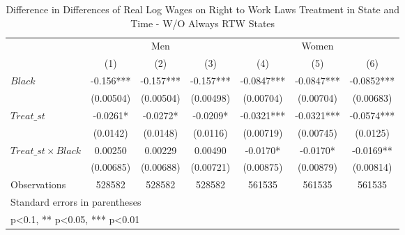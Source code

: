 \begin{table}[htbp]\centering
\def\sym#1{\ifmmode^{#1}\else\(^{#1}\)\fi}
\caption{Difference in Differences of Real Log Wages on Right to Work Laws Treatment in State and Time - W/O Always RTW States}
\begin{tabular}{l*{6}{c}}
\hline\hline
                    &\multicolumn{3}{c}{Men}                        &\multicolumn{3}{c}{Women}                      \\\cmidrule(lr){2-4}\cmidrule(lr){5-7}
                    &\multicolumn{1}{c}{(1)}   &\multicolumn{1}{c}{(2)}   &\multicolumn{1}{c}{(3)}   &\multicolumn{1}{c}{(4)}   &\multicolumn{1}{c}{(5)}   &\multicolumn{1}{c}{(6)}   \\
\hline
$ Black $           &      -0.156***&      -0.157***&      -0.157***&     -0.0847***&     -0.0847***&     -0.0852***\\
                    &   (0.00504)   &   (0.00504)   &   (0.00498)   &   (0.00704)   &   (0.00704)   &   (0.00683)   \\
[1em]
$ Treat\_{st} $      &     -0.0261*  &     -0.0272*  &     -0.0209*  &     -0.0321***&     -0.0321***&     -0.0574***\\
                    &    (0.0142)   &    (0.0148)   &    (0.0116)   &   (0.00719)   &   (0.00745)   &    (0.0125)   \\
[1em]
$ Treat\_{st} \times Black $&     0.00250   &     0.00229   &     0.00490   &     -0.0170*  &     -0.0170*  &     -0.0169** \\
                    &   (0.00685)   &   (0.00688)   &   (0.00721)   &   (0.00875)   &   (0.00879)   &   (0.00814)   \\
\hline
Observations        &      528582   &      528582   &      528582   &      561535   &      561535   &      561535   \\
\hline\hline
\multicolumn{7}{l}{\footnotesize Standard errors in parentheses}\\
\multicolumn{7}{l}{\footnotesize * p<0.1, ** p<0.05, *** p<0.01}\\
\end{tabular}
\end{table}
